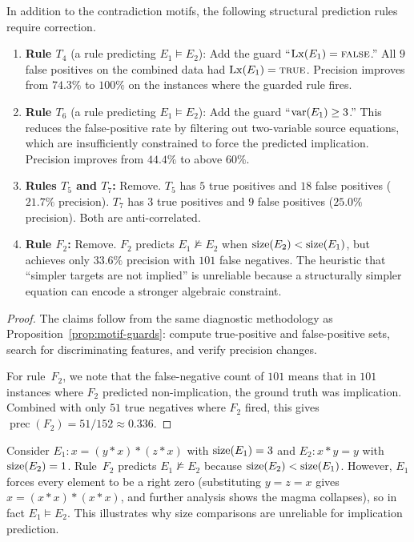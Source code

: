 \begin{proposition}\label{prop:structural-guards}
In addition to the contradiction motifs, the following structural
prediction rules require correction.
\begin{enumerate}[label=(\roman*)]
\item \textbf{Rule $T_4$} (a rule predicting $E_1 \models E_2$):
  Add the guard ``$\operatorname{Lx}(E_1) = \textsc{false}$.''
  All $9$ false positives on the combined data had
  $\operatorname{Lx}(E_1) = \textsc{true}$.  Precision improves from $74.3\%$
  to $100\%$ on the instances where the guarded rule fires.

\item \textbf{Rule $T_6$} (a rule predicting $E_1 \models E_2$):
  Add the guard ``$\operatorname{var}(E_1) \geq 3$.''
  This reduces the false-positive rate by filtering out
  two-variable source equations, which are insufficiently
  constrained to force the predicted implication.
  Precision improves from $44.4\%$ to above $60\%$.

\item \textbf{Rules $T_5$ and $T_7$:} Remove.  $T_5$ has $5$ true
  positives and $18$ false positives ($21.7\%$ precision).  $T_7$
  has $3$ true positives and $9$ false positives ($25.0\%$ precision).
  Both are anti-correlated.

\item \textbf{Rule $F_2$:} Remove.  $F_2$ predicts $E_1 \not\models E_2$
  when $\operatorname{size}(E_2) < \operatorname{size}(E_1)$, but achieves only $33.6\%$ precision
  with $101$ false negatives.  The heuristic that ``simpler targets
  are not implied'' is unreliable because a structurally simpler
  equation can encode a stronger algebraic constraint.
\end{enumerate}
\end{proposition}

\begin{proof}
The claims follow from the same diagnostic methodology as
Proposition~\ref{prop:motif-guards}: compute true-positive and
false-positive sets, search for discriminating features, and verify
precision changes.

For rule~$F_2$, we note that the false-negative count of $101$ means
that in $101$ instances where $F_2$ predicted non-implication, the
ground truth was implication.  Combined with only $51$ true negatives
where $F_2$ fired, this gives
$\operatorname{prec}(F_2) = 51/152 \approx 0.336$.
\end{proof}

\begin{example}\label{ex:F2-failure}
Consider $E_1\colon x = (y * x) * (z * x)$ with $\operatorname{size}(E_1) = 3$
and $E_2\colon x * y = y$ with $\operatorname{size}(E_2) = 1$.
Rule~$F_2$ predicts $E_1 \not\models E_2$ because
$\operatorname{size}(E_2) < \operatorname{size}(E_1)$.  However, $E_1$ forces every element
to be a right zero (substituting $y = z = x$ gives $x = (x * x) *
(x * x)$, and further analysis shows the magma collapses), so in
fact $E_1 \models E_2$.  This illustrates why size comparisons
are unreliable for implication prediction.
\end{example}

